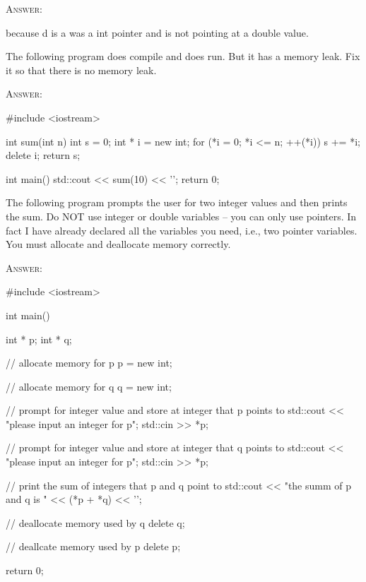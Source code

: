 \textsc{Answer:}
\begin{answercode}
because d is a was a int pointer and is not pointing at a double value.
\end{answercode}

\newpage
\nextq
The following program does compile and does run. But it has a memory leak.
Fix it so that there is no memory leak.

\textsc{Answer:}
\begin{answercode}
#include <iostream>

int sum(int n)
{
    int s = 0;
    int * i = new int;
    for (*i = 0; *i <= n; ++(*i))
    {
        s += *i;
    }
    delete i;
    return s;
}

int main()
{
    std::cout << sum(10) << '\n';
    return 0;
}
\end{answercode}

\newpage
\nextq
The following program prompts the user for two integer values
and then prints the sum.
Do NOT use integer or double variables -- you can only use pointers.
In fact I have already declared all the variables you need,
i.e., two pointer variables.
You must allocate and deallocate memory correctly.

\textsc{Answer:}
\begin{answercode}
#include <iostream>

int main()
{
    int * p;
    int * q;

    // allocate memory for p
    p = new int;

    // allocate memory for q
    q = new int;

    // prompt for integer value and store at integer that p points to
    std::cout << "please input an integer for p\n";
    std::cin >> *p;

    // prompt for integer value and store at integer that q points to
    std::cout << "please input an integer for p\n";
    std::cin >> *p;

    // print the sum of integers that p and q point to
    std::cout << "the summ of p and q is " << (*p + *q) << '\n';

    // deallocate memory used by q
    delete q;

    // deallcate memory used by p
    delete p;

    return 0;
}
\end{answercode}

